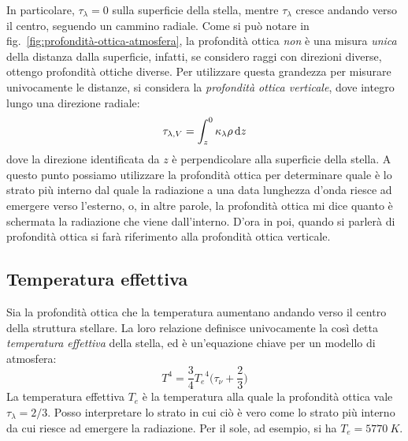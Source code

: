 In particolare, $\tau_\lambda = 0$ sulla superficie della stella, mentre $\tau_\lambda$ cresce andando verso il centro, seguendo un cammino radiale. Come si può notare in fig.~\ref{fig:profondità-ottica-atmosfera}, la profondità ottica \emph{non} è una misura \emph{unica} della distanza dalla superficie, infatti, se considero raggi con direzioni diverse, ottengo profondità ottiche diverse. Per utilizzare questa grandezza per misurare univocamente le distanze, si considera la \emph{profondità ottica verticale}, dove integro lungo una direzione radiale:
\begin{equation}\label{eq:profondità-ottica-verticale}
    \tau_{\lambda, V} = \int_z^0 \kappa_\lambda \rho \mathop{}\!\mathrm{d} z
\end{equation}
dove la direzione identificata da $z$ è perpendicolare alla superficie della stella. A questo punto possiamo utilizzare la profondità ottica per determinare quale è lo strato più interno dal quale la radiazione a una data lunghezza d'onda riesce ad emergere verso l’esterno, o, in altre parole, la profondità ottica mi dice quanto è schermata la radiazione che viene dall'interno. D'ora in poi, quando si parlerà di profondità ottica si farà riferimento alla profondità ottica verticale.

\subsection{Temperatura effettiva}
Sia la profondità ottica che la temperatura aumentano andando verso il centro della struttura stellare. La loro relazione definisce univocamente la così detta \emph{temperatura effettiva} della stella, ed è un'equazione chiave per un modello di atmosfera:
\begin{equation}\label{temperatura-effettiva}
    T^4 = \frac{3}{4} {T_e}^4 \bigl( \tau_\nu + \frac{2}{3} \bigr)
\end{equation}
La temperatura effettiva $T_e$ è la temperatura alla quale la profondità ottica vale $\tau_\lambda = 2 / 3$. Posso interpretare lo strato in cui ciò è vero come lo strato più interno da cui riesce ad emergere la radiazione. Per il sole, ad esempio, si ha $T_e = \SI{5770}{K}$.

